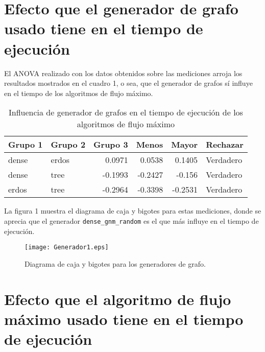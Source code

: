 \documentclass{article}
\begin{document}
 

\section*{Efecto que el generador de grafo usado tiene en el tiempo de ejecución}

El ANOVA realizado con los datos obtenidos sobre las mediciones arroja los resultados mostrados en el cuadro 1, o sea, que el generador de grafos sí influye en el tiempo de los algoritmos de flujo máximo.

\begin{table}[htbp]
  \centering
  \caption{Influencia de generador de grafos en el tiempo de ejecución de los algoritmos de flujo máximo}
    \begin{tabular}{|l|l|r|r|r|l|}
    \toprule
    \rowcolor[rgb]{ .357,  .608,  .835} \textbf{Grupo 1} & \textbf{Grupo 2} & \multicolumn{1}{l|}{\textbf{Grupo 3}} & \multicolumn{1}{l|}{\textbf{Menos}} & \multicolumn{1}{l|}{\textbf{Mayor}} & \textbf{Rechazar} \\
    \midrule
    dense & erdos & 0.0971 & 0.0538 & 0.1405 & Verdadero \\
    \midrule
    dense & tree  & -0.1993 & -0.2427 & -0.156 & Verdadero \\
    \midrule
    erdos & tree  & -0.2964 & -0.3398 & -0.2531 & Verdadero \\
    \bottomrule
    \end{tabular}
  \label{tab:Cuadro 1}
\end{table}

La figura 1 muestra el diagrama de caja y bigotes para estas mediciones, donde se aprecia que el generador \texttt{dense\_gnm\_random} es el que más influye en el tiempo de ejecución.

\begin{figure}
\begin{center}
  \texttt{[image: Generador1.eps]}
\end{center}
\vspace*{-8mm}
\caption{Diagrama de caja y bigotes para los generadores de grafo.}
  \label{Figura 2} 
\end{figure}

\section*{Efecto que el algoritmo de flujo máximo usado tiene en el tiempo de ejecución}
\end{document}
